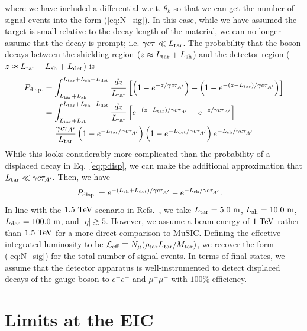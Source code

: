 where we have included a differential w.r.t. $\theta_k$ so that we can get the number of signal events into the form (\ref{eq:N_sig}). In this case, while we have assumed the target is small relative to the decay length of the material, we can no longer assume that the decay is prompt; i.e. $\gamma c \tau \ll L_{\rm tar}$. The probability that the boson decays between the shielding region $(z \approx L_{\rm tar} + L_{\rm sh}$) and the detector region ($z\approx L_{\rm tar} + L_{\rm sh} + L_{\rm det}$) is 
\begin{align}
    P_{\rm disp.} &= \int_{L_{\rm tar} + L_{\rm sh}}^{L_{\rm tar} + L_{\rm sh} + L_{\rm det}}\frac{dz}{L_{\rm tar}}\left[\left(1 - e^{-z/\gamma c \tau_{A'}}\right) - \left(1 - e^{-(z-L_{\rm tar})/\gamma c \tau_{A'}}\right)\right]\nonumber \\
    &= \int_{L_{\rm tar} + L_{\rm sh}}^{L_{\rm tar} + L_{\rm sh} + L_{\rm det}}\frac{dz}{L_{\rm tar}}\left[e^{-(z-L_{\rm tar})/\gamma c \tau_{A'}} - e^{-z/\gamma c \tau_{A'}}\right] \nonumber\\
    &= \frac{\gamma c \tau_{A'}}{L_{\rm tar}}\left(1 - e^{-L_{\rm tar}/\gamma c \tau_{A'}}\right)\left(1 - e^{-L_{\rm det}/\gamma c \tau_{A'}}\right)e^{-L_{\rm sh}/\gamma c \tau_{A'}}
\end{align}
While this looks considerably more complicated than the probability of a displaced decay in Eq.~\ref{eq:pdisp}, we can make the additional approximation that $L_{\rm tar} \ll \gamma c \tau_{A'}$. Then, we have
\begin{align}
    P_{\rm disp.} &= e^{-(L_{\rm sh} + L_{\rm det})/\gamma c \tau_{A'}} - e^{-L_{\rm sh}/\gamma c \tau_{A'}}.
\end{align}
In line with the $1.5~{\rm TeV}$ scenario in Refs.~\cite{Cesarotti:2022ttv,Cesarotti:2023sje}, we take $L_{\rm tar} = 5.0~{\rm m}$, $L_{\rm sh} = 10.0~{\rm m}$, $L_{\rm dec} = 100.0~{\rm m}$, and $|\eta| \gtrsim 5$. However, we assume a beam energy of $1~{\rm TeV}$ rather than $1.5~{\rm TeV}$ for a more direct comparison to MuSIC. Defining the effective integrated luminosity to be ${\cal L}_{\rm eff} \equiv N_\mu (\rho_{\rm tar}L_{\rm tar}/M_{\rm tar})$, we recover the form (\ref{eq:N_sig}) for the total number of signal events. In terms of final-states, we assume that the detector apparatus is well-instrumented to detect displaced decays of the gauge boson to $e^+e^-$ and  $\mu^+\mu^-$ with $100\%$ efficiency.



\section{Limits at the EIC}\label{sec:vector_EIC_limits}

